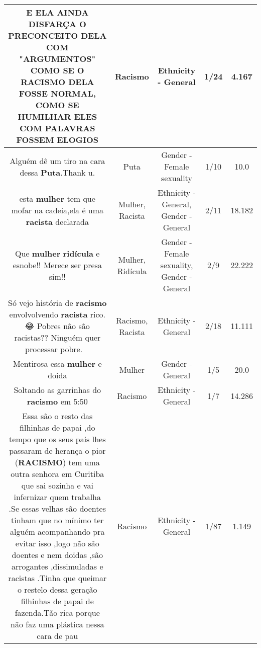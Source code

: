 \documentclass[11pt]{article}
\newlength\mylength
\begin{document}
\begin{center}
\begin{longtable}{|C{.65\mylength}|C{.30\mylength}|C{.12\mylength}|C{.12\mylength}|C{.12\mylength}|}
  \small E ELA AINDA DISFARÇA O PRECONCEITO DELA COM "ARGUMENTOS" COMO SE O \textbf{RACISMO} DELA FOSSE NORMAL, COMO SE HUMILHAR ELES COM PALAVRAS FOSSEM ELOGIOS\normalsize   & Racismo & Ethnicity - General & 1/24 & 4.167 \\  \hline
  \small Alguém dê um tiro na cara dessa \textbf{Puta}.Thank u.\normalsize   & Puta & Gender - Female sexuality & 1/10 & 10.0 \\  \hline
  \small esta \textbf{mulher} tem que mofar na cadeia,ela é uma \textbf{racista} declarada\normalsize   & Mulher, Racista & Ethnicity - General, Gender - General & 2/11 & 18.182 \\  \hline
  \small Que \textbf{mulher} \textbf{ridícula} e esnobe!!  Merece ser presa sim!!\normalsize   & Mulher, Ridícula & Gender - Female sexuality, Gender - General & 2/9 & 22.222 \\  \hline
  \small Só vejo história de \textbf{racismo} envolvolvendo \textbf{racista} rico. 😂 Pobres não são racistas?? Ninguém quer processar pobre. 🤔😂\normalsize   & Racismo, Racista & Ethnicity - General & 2/18 & 11.111 \\  \hline
  \small Mentirosa essa \textbf{mulher} e doida\normalsize   & Mulher & Gender - General & 1/5 & 20.0 \\  \hline
  \small Soltando as garrinhas do \textbf{racismo} em 5:50\normalsize   & Racismo & Ethnicity - General & 1/7 & 14.286 \\  \hline
  \small Essa são o resto das filhinhas de papai ,do tempo que os seus pais lhes passaram de herança o pior (\textbf{RACISMO}) tem uma outra senhora em Curitiba que sai sozinha e vai infernizar quem trabalha .Se essas velhas são doentes tinham que no mínimo ter alguém acompanhando pra evitar isso ,logo não são doentes e nem doidas ,são arrogantes ,dissimuladas e racistas .Tinha que queimar o restelo dessa geração filhinhas de papai de fazenda.Tão rica porque não faz uma plástica nessa cara de pau\normalsize   & Racismo & Ethnicity - General & 1/87 & 1.149 \\  \hline

\end{longtable}
\end{center}
\end{document}
